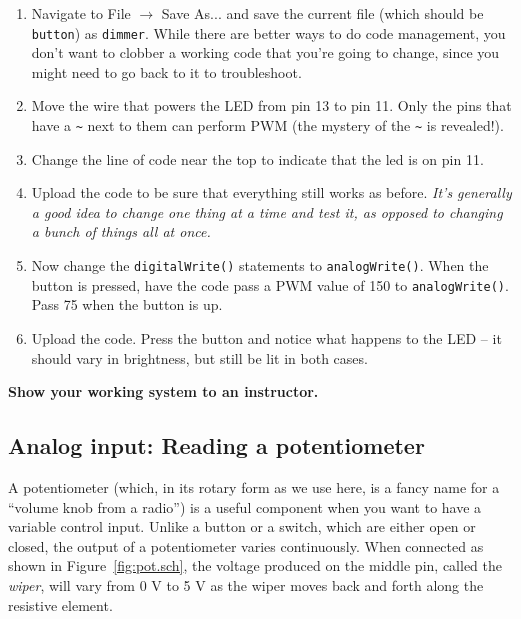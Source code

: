 \documentclass[11pt]{article} %
\begin{document}
\begin{enumerate}
\item Navigate to File $\rightarrow$ Save As... and save the current file (which should be \verb|button|) as \verb|dimmer|. While there are better ways to do code management, you don't want to clobber a working code that you're going to change, since you might need to go back to it to troubleshoot.
\item Move the wire that powers the LED from pin 13 to pin 11. Only the pins that have a \verb|~| next to them can perform PWM (the mystery of the \verb|~| is revealed!).
\item Change the line of code near the top to indicate that the led is on pin 11.
\item Upload the code to be sure that everything still works as before. \emph{It’s generally a good idea to change one thing at a time and test it, as opposed to changing a bunch of things all at once.}
\item Now change the \verb|digitalWrite()| statements to \verb|analogWrite()|. When the button is pressed, have the code pass a PWM value of 150 to \verb|analogWrite()|. Pass 75 when the button is up.
\item Upload the code. Press the button and notice what happens to the LED -- it should vary in brightness, but still be lit in both cases.
\end{enumerate}

{\bf Show your working system to an instructor.}

\subsection*{Analog input: Reading a potentiometer}

A potentiometer (which, in its rotary form as we use here, is a fancy name for a ``volume knob from a radio'') is a useful component when you want to have a variable control input. Unlike a button or a switch, which are either open or closed, the output of a potentiometer varies continuously. When connected as shown in Figure~\ref{fig:pot.sch}, the voltage produced on the middle pin, called the \emph{wiper}, will vary from 0 V to 5 V as the wiper moves back and forth along the resistive element.
\end{document}
